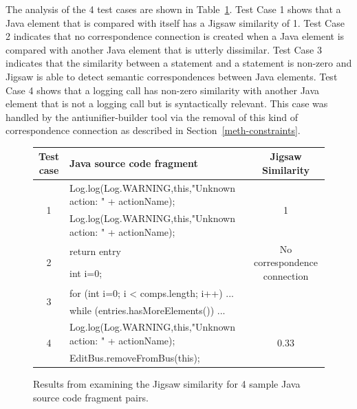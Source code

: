 The analysis of the 4 test cases are shown in Table~\ref{jigsaw_4_test_cases}. Test Case 1 shows that a Java element that is compared with itself has a Jigsaw similarity of 1. Test Case 2 indicates that no correspondence connection is created when a Java element is compared with another Java element that is utterly dissimilar. Test Case 3 indicates that the similarity between a  statement and a  statement is non-zero and Jigsaw is able to detect semantic correspondences between Java elements. Test Case 4 shows that a logging call has non-zero similarity with another Java element that is not a logging call but is syntactically relevant. This case was handled by the antiunifier-builder tool via the removal of this kind of correspondence connection as described in  Section~\ref{meth-constraints}. 

\begin{figure}
  \centering
  \begin{tabular}{|c|l|c|}
    \hline
    Test case & Java source code fragment & Jigsaw Similarity\\
    \hline
    
    \multirow{2}{*}{{1}}&Log.log(Log.WARNING,this,"Unknown action: " + actionName);& \multirow{2}{*}{1}\\
    \cline{2-2}
                         &Log.log(Log.WARNING,this,"Unknown action: " + actionName);\\
    \hline
    
       \multirow{2}{*}{2}&return entry& \multirow{2}{*}{ No correspondence connection}\\
    \cline{2-2}
       &int i=0;\\
    \hline
  
    
 \multirow{2}{*}{3}&
 for (int i=0; i < comps.length; i++) {...} \\
  

    \cline{2-2}
      & 
while (entries.hasMoreElements())  { ...}    
      \\
    \hline    
    
    \multirow{2}{*}{4}&Log.log(Log.WARNING,this,"Unknown action: " + actionName);& \multirow{2}{*}{0.33}\\
    \cline{2-2}
      &EditBus.removeFromBus(this);\\
    \hline
    
  \end{tabular}
  \caption{Results from examining the Jigsaw similarity for 4 sample Java source code fragment pairs.}
  \label{jigsaw_4_test_cases}
\end{figure}
 


